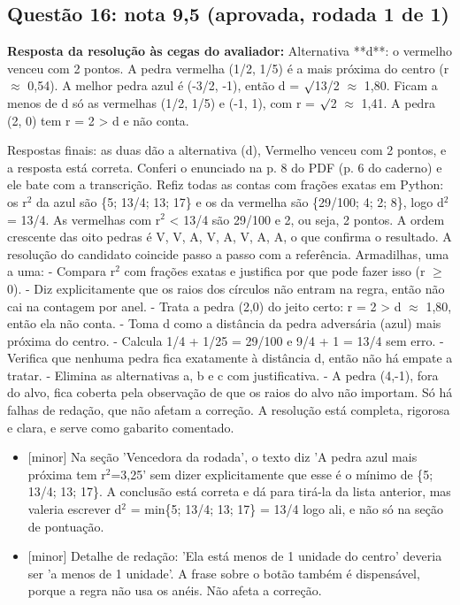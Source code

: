 \documentclass{article}%
\begin{document}
\subsection*{Questão 16: nota 9,5 (aprovada, rodada 1 de 1)}%
\textbf{Resposta da resolução às cegas do avaliador:} Alternativa **d**: o vermelho venceu com 2 pontos. A pedra vermelha (1/2, 1/5) é a mais próxima do centro (r $\approx$ 0,54). A melhor pedra azul é (-3/2, -1), então d = $\surd$13/2 $\approx$ 1,80. Ficam a menos de d só as vermelhas (1/2, 1/5) e (-1, 1), com r = $\surd$2 $\approx$ 1,41. A pedra (2, 0) tem r = 2 > d e não conta.\par %
Respostas finais: as duas dão a alternativa (d), Vermelho venceu com 2 pontos, e a resposta está correta. Conferi o enunciado na p. 8 do PDF (p. 6 do caderno) e ele bate com a transcrição. Refiz todas as contas com frações exatas em Python: os r$^2$ da azul são \{5; 13/4; 13; 17\} e os da vermelha são \{29/100; 4; 2; 8\}, logo d$^2$ = 13/4. As vermelhas com r$^2$ < 13/4 são 29/100 e 2, ou seja, 2 pontos. A ordem crescente das oito pedras é V, V, A, V, A, V, A, A, o que confirma o resultado. A resolução do candidato coincide passo a passo com a referência.\newline%
\newline%
Armadilhas, uma a uma:\newline%
{-} Compara r$^2$ com frações exatas e justifica por que pode fazer isso (r $\geq$ 0).\newline%
{-} Diz explicitamente que os raios dos círculos não entram na regra, então não cai na contagem por anel.\newline%
{-} Trata a pedra (2,0) do jeito certo: r = 2 > d $\approx$ 1,80, então ela não conta.\newline%
{-} Toma d como a distância da pedra adversária (azul) mais próxima do centro.\newline%
{-} Calcula 1/4 + 1/25 = 29/100 e 9/4 + 1 = 13/4 sem erro.\newline%
{-} Verifica que nenhuma pedra fica exatamente à distância d, então não há empate a tratar.\newline%
{-} Elimina as alternativas a, b e c com justificativa.\newline%
{-} A pedra (4,-1), fora do alvo, fica coberta pela observação de que os raios do alvo não importam.\newline%
\newline%
Só há falhas de redação, que não afetam a correção. A resolução está completa, rigorosa e clara, e serve como gabarito comentado.%
\begin{itemize}%
\item%
{[}minor{]} Na seção 'Vencedora da rodada', o texto diz 'A pedra azul mais próxima tem r$^2$=3,25' sem dizer explicitamente que esse é o mínimo de \{5; 13/4; 13; 17\}. A conclusão está correta e dá para tirá{-}la da lista anterior, mas valeria escrever d$^2$ = min\{5; 13/4; 13; 17\} = 13/4 logo ali, e não só na seção de pontuação.%
\item%
{[}minor{]} Detalhe de redação: 'Ela está menos de 1 unidade do centro' deveria ser 'a menos de 1 unidade'. A frase sobre o botão também é dispensável, porque a regra não usa os anéis. Não afeta a correção.%
\end{itemize}%
\end{document}
